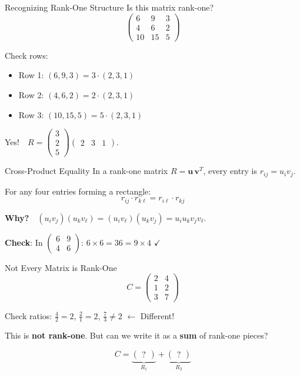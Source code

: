 \documentclass[10pt]{beamer}
\theoremstyle{definition}
\newcommand{\x}[1]{\alert{\textbf{#1}}}
\begin{document}
\begin{frame}{Recognizing Rank-One Structure}
Is this matrix rank-one?
$$\begin{pmatrix}
6 & 9 & 3 \\
4 & 6 & 2 \\
10 & 15 & 5
\end{pmatrix}$$

\vfill
Check rows:
\begin{itemize}
\item Row 1: $(6, 9, 3) = 3 \cdot (2, 3, 1)$
\item Row 2: $(4, 6, 2) = 2 \cdot (2, 3, 1)$
\item Row 3: $(10, 15, 5) = 5 \cdot (2, 3, 1)$
\end{itemize}

\vfill
Yes!\ \ $R = \begin{pmatrix} 3 \\ 2 \\ 5 \end{pmatrix} \begin{pmatrix} 2 & 3 & 1 \end{pmatrix}$.
\end{frame}

\begin{frame}{Cross-Product Equality}
In a rank-one matrix $R = \mathbf{u}\,\mathbf{v}^T$, every entry is $r_{ij} = u_i v_j$.

\vfill
For any four entries forming a rectangle:
$$\boxed{r_{ij} \cdot r_{k\ell} = r_{i\ell} \cdot r_{kj}}$$

\vfill
\textbf{Why?}\ \ $(u_i v_j)(u_k v_\ell) = (u_i v_\ell)(u_k v_j) = u_i u_k v_j v_\ell$.

\vfill
\textbf{Check}: In $\begin{pmatrix} 6 & 9 \\ 4 & 6 \end{pmatrix}$: \quad $6 \times 6 = 36 = 9 \times 4$ \quad $\checkmark$
\end{frame}

\begin{frame}{Not Every Matrix is Rank-One}
$$C = \begin{pmatrix}
2 & 4 \\
1 & 2 \\
3 & 7
\end{pmatrix}$$

\vfill
Check ratios: $\frac{4}{2} = 2$, \quad $\frac{2}{1} = 2$, \quad $\frac{7}{3} \neq 2$ \quad $\leftarrow$ Different!

\vfill
This is \x{not rank-one}. But can we write it as a \x{sum} of rank-one pieces?

$$C = \underbrace{\begin{pmatrix} ? \end{pmatrix}}_{R_1} + \underbrace{\begin{pmatrix} ? \end{pmatrix}}_{R_2}$$
\end{frame}
\end{document}
